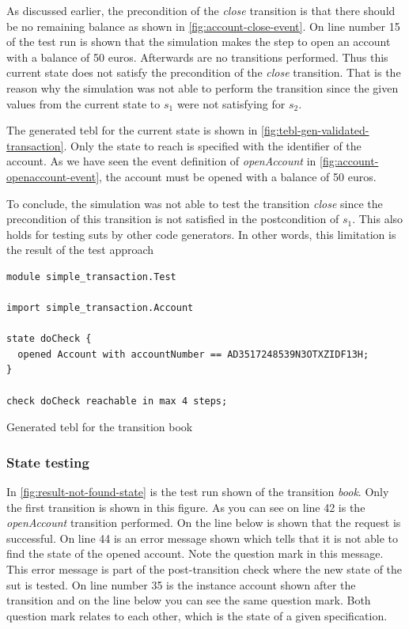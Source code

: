 As discussed earlier, the precondition of the \textit{close} transition is that there
should be no remaining balance as shown in \autoref{fig:account-close-event}.
On line number 15 of the test run is shown that the simulation makes the step to
open an account with a balance of 50 euros. Afterwards are no transitions
performed. Thus this current state does not satisfy the precondition of the
\textit{close} transition. That is the reason why the simulation was not able to perform the
transition since the given values from the current state to $s_{1}$ were not
satisfying for $s_{2}$.

The generated tebl for the current state is shown in
\autoref{fig:tebl-gen-validated-transaction}. Only the state to reach is
specified with the identifier of the account. As we have seen the event definition
of \textit{openAccount} in \autoref{fig:account-openaccount-event}, the account
must be opened with a balance of 50 euros.

To conclude, the simulation was not able to test the transition \textit{close} since the
precondition of this transition is not satisfied in the postcondition of $s_{1}$.
This also holds for testing \gls{sut}s by other code generators. In other
words, this limitation is the result of the test approach

\begin{sourcecode}[h!]
\begin{lstlisting}[]
module simple_transaction.Test

import simple_transaction.Account

state doCheck {
  opened Account with accountNumber == AD3517248539N3OTXZIDF13H;
}

check doCheck reachable in max 4 steps;
\end{lstlisting}
\caption{Generated tebl for the transition book}\label{fig:tebl-gen-validated-transaction}
\end{sourcecode}
\FloatBarrier

\subsubsection{State testing}

In \autoref{fig:result-not-found-state} is the test run shown of the transition
\textit{book}. Only the first transition is shown in this figure. As you can
see on line 42 is the \textit{openAccount} transition performed. On the line
below is shown that the request is successful. On line 44 is an error message
shown which tells that it is not able to find the state of the opened account.
Note the question mark in this message. This error message is part of the
post-transition check where the new state of the \gls{sut} is tested. On line number
35 is the instance account shown after the transition and on the line below you
can see the same question mark. Both question mark relates to each other, which
is the state of a given specification.

